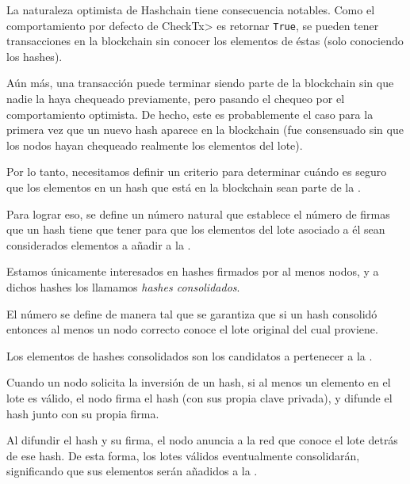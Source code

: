 %
La naturaleza optimista de Hashchain tiene consecuencia notables.
%
Como el comportamiento por defecto de  \<CheckTx> es retornar \texttt{True},
se pueden tener transacciones en la blockchain sin conocer los elementos de éstas
(solo conociendo los hashes).

%
Aún más, una transacción puede terminar siendo parte de la blockchain sin que nadie
la haya chequeado previamente, pero pasando el chequeo por el comportamiento optimista.
%
De hecho, este es probablemente el caso para la primera vez que un nuevo hash aparece
en la blockchain (fue consensuado sin que los nodos hayan chequeado realmente los elementos
del lote).

%

Por lo tanto, necesitamos definir un criterio para determinar cuándo es seguro
que los elementos en un hash que está en la blockchain sean parte de la \setchain.

%
Para lograr eso, se define un número natural \SPH que establece
el número de firmas que un hash tiene que tener para que los elementos del lote asociado a él
sean considerados elementos a añadir a la \setchain.

%
Estamos únicamente interesados en hashes firmados por al menos \SPH
nodos, y a dichos hashes los llamamos \textit{hashes consolidados}.

El número \SPH se define de manera tal que se garantiza que si un hash
consolidó entonces al menos un nodo correcto conoce el lote original del cual proviene.

%
Los elementos de hashes consolidados son los candidatos a pertenecer a la \setchain.

%
Cuando un nodo solicita la inversión de un hash, si al menos un elemento en el lote
es válido, el nodo firma el hash (con sus propia clave privada), y difunde el hash junto
con su propia firma.

%
Al difundir el hash y su firma, el nodo anuncia a la red que conoce el lote detrás de ese hash.
%
De esta forma, los lotes válidos eventualmente consolidarán, significando que sus elementos
serán añadidos a la \setchain.


